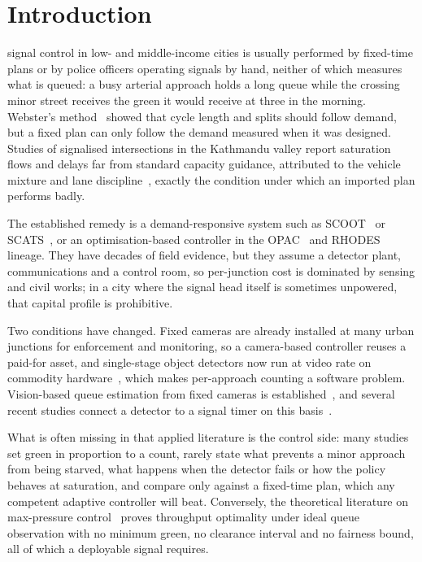 \documentclass[journal]{IEEEtran}
\begin{document}
\section{Introduction}

 signal control in low- and middle-income cities is usually performed by fixed-time
plans or by police officers operating signals by hand, neither of which measures what is queued: a busy
arterial approach holds a long queue while the crossing minor street receives the green it would receive at
three in the morning. Webster's method~\cite{Webster1958TrafficSignalSettings} showed that cycle length and
splits should follow demand, but a fixed plan can only follow the demand measured when it was designed.
Studies of signalised intersections in the Kathmandu valley report saturation flows and delays far from
standard capacity guidance, attributed to the vehicle mixture and lane
discipline~\cite{shrestha2014development,nepali2024assessment}, exactly the condition under which an imported
plan performs badly.

The established remedy is a demand-responsive system such as SCOOT~\cite{Hunt1981SCOOT}
or SCATS~\cite{Sims1980SCATS}, or an optimisation-based controller in the OPAC~\cite{Gartner1983OPAC} and
RHODES~\cite{Mirchandani2001RHODES} lineage. They have decades of field evidence, but they assume a detector plant,
communications and a control room, so per-junction cost is dominated by sensing and civil works; in a city
where the signal head itself is sometimes unpowered, that capital profile is prohibitive.

Two conditions have changed. Fixed cameras are already installed at many urban junctions for enforcement and
monitoring, so a camera-based controller reuses a paid-for asset, and single-stage object detectors now run
at video rate on commodity hardware~\cite{redmon2016yolo,bochkovskiy2020yolov4}, which makes per-approach
counting a software problem. Vision-based queue estimation from fixed cameras is
established~\cite{umair2021efficient}, and several recent studies connect a detector to a signal timer on this
basis~\cite{papanashi2024adaptive,alruyshid2025aibased,talaat2025smart,medvei2025deepsignal}.

What is often missing in that applied literature is the control side: many studies set green in proportion
to a count, rarely state what prevents a minor approach from being starved, what happens when the detector
fails or how the policy behaves at saturation, and compare only against a fixed-time plan, which any
competent adaptive controller will beat. Conversely, the theoretical literature on max-pressure
control~\cite{Varaiya2013MaxPressure} proves throughput optimality under ideal queue observation with no
minimum green, no clearance interval and no fairness bound, all of which a deployable signal requires.
\end{document}
